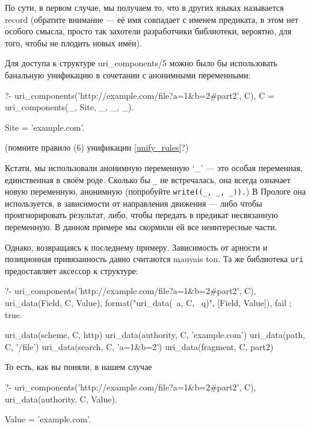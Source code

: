 \documentclass[a4paper]{book}
\begin{document}
По сути, в первом случае, мы получаем то, что в других языках
называется record (обратите внимание --- её имя совпадает с
именем предиката, в этом нет особого смысла, просто так захотели
разработчики библиотеки, вероятно, для того, чтобы не плодить
новых имён).

Для доступа к структуре uri_components/5 можно было бы
использовать банальную унификацию в сочетании с анонимными
переменными:

\begin{example}{}{}
?- uri_components('http://example.com/file?a=1&b=2#part2', C),
   C = uri_components(_, Site, _, _, _).

Site = 'example.com'.
\end{example}

(помните правило (6) унификации \ref{unify_rules}?)

Кстати, мы использовали анонимную переменную `_' --- это особая
переменная, единственная в своём роде. Сколько бы \verb|_| не
встречалась, она всегда означает новую переменную, анонимную
(попробуйте \verb|write((_, _, _)).|) В Прологе она используется,
в зависимости от направления движения --- либо чтобы
проигнорировать результат, либо, чтобы передать в предикат
несвязанную переменную. В данном примере мы скормили ей все
неинтересные части.

Однако, возвращаясь к последнему примеру. Зависимость от арности
и позиционная привязанность давно считаются mauvais ton. Та же
библиотека \verb|uri| предоставляет аксессор к структуре:

\begin{example}{}{}
?- uri_components('http://example.com/file?a=1&b=2#part2', C),
   uri_data(Field, C, Value), 
   format("uri_data(~a, C, ~q)\n", [Field, Value]), 
   fail ; true.                                                             

uri_data(scheme, C, http)
uri_data(authority, C, 'example.com')
uri_data(path, C, '/file')
uri_data(search, C, 'a=1&b=2')
uri_data(fragment, C, part2)
\end{example}

То есть, как вы поняли, в нашем случае 

\begin{example}{}{}
?- uri_components('http://example.com/file?a=1&b=2#part2', C),
   uri_data(authority, C, Value).                                           

Value = 'example.com'.
\end{example}
\end{document}
